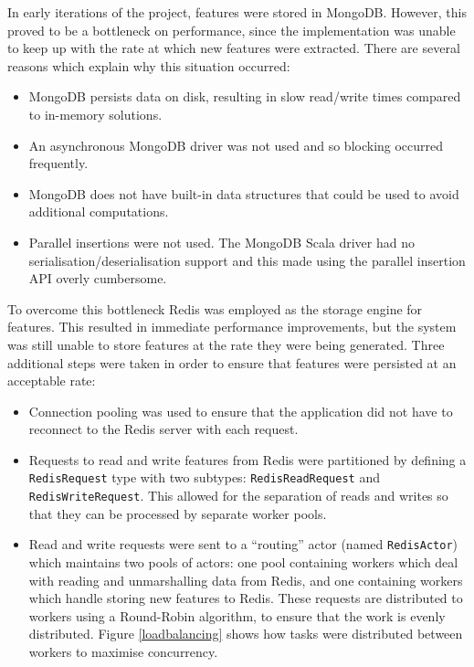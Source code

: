\documentclass{l4proj}
\newcommand{\code}[1]{\texttt{#1}}
\begin{document}
        In early iterations of the project, features were stored in MongoDB. However, this proved to be a bottleneck on performance, since the implementation was unable to keep up with the rate at which new features were extracted. There are several reasons which explain why this situation occurred:
        
        \begin{itemize}
        \item MongoDB persists data on disk, resulting in slow read/write times compared to in-memory solutions.
        \item An asynchronous MongoDB driver was not used and so blocking occurred frequently.
        \item MongoDB does not have built-in data structures that could be used to avoid additional computations.
        \item Parallel insertions were not used. The MongoDB Scala driver had no serialisation/deserialisation support and this made using the parallel insertion API overly cumbersome.
        \end{itemize}
        
        To overcome this bottleneck Redis was employed as the storage engine for features. This resulted in immediate performance improvements, but the system was still unable to store features at the rate they were being generated. Three additional steps were taken in order to ensure that features were persisted at an acceptable rate:
        
        \begin{itemize}
        \item Connection pooling was used to ensure that the application did not have to reconnect to the Redis server with each request.
        \item Requests to read and write features from Redis were partitioned by defining a \code{RedisRequest} type with two subtypes: \code{RedisReadRequest} and \code{RedisWriteRequest}. This allowed for the separation of reads and writes so that they can be processed by separate worker pools.
        \item Read and write requests were sent to a ``routing'' actor (named \code{RedisActor}) which maintains two pools of actors: one pool containing workers which deal with reading and unmarshalling data from Redis, and one containing workers which handle storing new features to Redis. These requests are distributed to workers using a Round-Robin algorithm, to ensure that the work is evenly distributed. Figure \ref{loadbalancing} shows how tasks were distributed between workers to maximise concurrency.
        \end{itemize}
\end{document}
